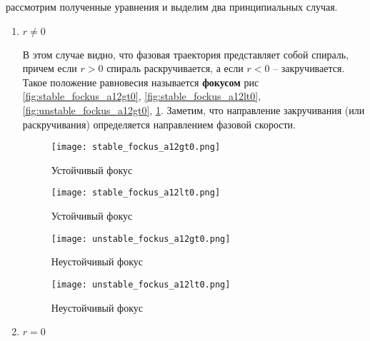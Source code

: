 \documentclass[a4paper, 12pt]{article}
\begin{document}
\begin{enumerate}
      рассмотрим полученные уравнения и выделим два принципиальных случая.

      \begin{enumerate}
        \item $r \neq 0$
        
        В этом случае видно, что фазовая траектория представляет собой спираль, причем если $r > 0$ спираль раскручивается, а если $r < 0$ -- закручивается. Такое положение равновесия называется \textbf{фокусом} рис \ref{fig:stable_fockus_a12gt0}, \ref{fig:stable_fockus_a12lt0}, \ref{fig:unstable_fockus_a12gt0}, \ref{fug:unstable_fockus_a12lt0}. Заметим, что направление закручивания (или раскручивания) определяется направлением фазовой скорости.

        \begin{figure}[h!]
          \begin{center}
              \begin{minipage}[h!]{0.48\linewidth}
                  \texttt{[image: stable\_fockus\_a12gt0.png]}
                  \caption{Устойчивый фокус}
                  \label{fig:stable_fockus_a12gt0}
              \end{minipage}
              \hfill
              \begin{minipage}[h!]{0.48\linewidth}
                  \texttt{[image: stable\_fockus\_a12lt0.png]}
                  \caption{Устойчивый фокус}
                  \label{fig:stable_fockus_a12lt0}
              \end{minipage}
              \hfill
              \begin{minipage}[h!]{0.48\linewidth}
                  \texttt{[image: unstable\_fockus\_a12gt0.png]}
                  \caption{Неустойчивый фокус}
                  \label{fig:unstable_fockus_a12gt0}
              \end{minipage}
              \hfill
              \begin{minipage}[h!]{0.48\linewidth}
                  \texttt{[image: unstable\_fockus\_a12lt0.png]}
                  \caption{Неустойчивый фокус}
                  \label{fug:unstable_fockus_a12lt0}
              \end{minipage}
          \end{center}
      \end{figure}

      \item $r = 0$
      

\end{enumerate}
\end{enumerate}
\end{document}
